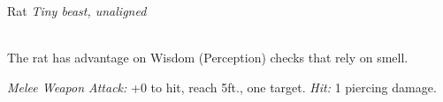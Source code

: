 \documentclass[10pt,twoside,twocolumn,openany]{book}
\begin{document}
\newpage
\begin{monsterboxnobg}{Rat}
	\textit{Tiny beast, unaligned}\\
	\hline
	\basics[
		armorclass	= 10,
		hitpoints 		= 1 (1d4 - 1),
		speed		= {20 ft.}
	]
	\hline
	\stats[
		STR	= \stat{2},
		DEX	= \stat{11},
		CON	= \stat{9},
		INT	= \stat{2},
		WIS	= \stat{10},
		CHA	= \stat{4}
	]
	\hline
	\details[
		skills			= {},
		senses 		= {darkvision 30 ft., passive Perception 13},
		languages		= {-},
		challenge		= 0
	]
	\hline \\[1mm]
	\begin{monsteraction}
		The rat has advantage on Wisdom (Perception) checks that rely on smell.
	\end{monsteraction}
	\begin{monsteraction}[Bite]
		\textit{Melee Weapon Attack:} +0 to hit, reach 5ft., one target. \textit{Hit:} 1 piercing damage.
	\end{monsteraction}
\end{monsterboxnobg}
\end{document}
